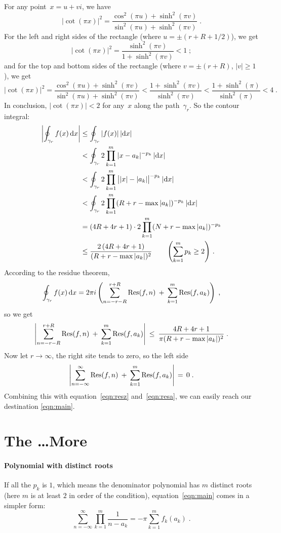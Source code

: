 \documentclass[10pt,a4paper]{article}
\begin{document}
	For any point~$x=u+vi$, we have
	\[
	|\cot (\pi x)|^2=\frac{\cos^2(\pi u)+\sinh^2(\pi v)}{\sin^2(\pi u)+\sinh^2(\pi v)}\; .
	\]
	For the left and right sides of the rectangle (where $u=\pm (r+R+1/2)$), we get
	\[
	|\cot (\pi x)|^2=\frac{\sinh^2(\pi v)}{1+\sinh^2(\pi v)}<1\; ;
	\]
	and for the top and bottom sides of the rectangle (where $v=\pm(r+R)$, $|v|\geq1$), we get
	\[
	|\cot (\pi x)|^2=\frac{\cos^2(\pi u)+\sinh^2(\pi v)}{\sin^2(\pi u)+\sinh^2(\pi v)}<\frac{1+\sinh^2(\pi v)}{\sinh^2(\pi v)}<\frac{1+\sinh^2(\pi)}{\sinh^2(\pi)}<4 \; .
	\]
	In conclusion, $|\cot (\pi x)|<2$ for any~$x$ along the path~$\gamma_r$. So the contour integral:
	\begin{align*}
	\left| \oint_{\gamma_r}f(x)\,\mathrm{d} x\right|&\leq  \oint_{\gamma_r}|f(x)|\,|\mathrm{d} x|  \\
	&<  \oint_{\gamma_r}2\prod_{k=1}^{m}|x-a_k | ^{-p_k}\,|\mathrm{d} x| \\
	&<  \oint_{\gamma_r}2\prod_{k=1}^{m}\big||x|-|a_k| \big| ^{-p_k}\,|\mathrm{d} x| \\
	&<  \oint_{\gamma_r}2\prod_{k=1}^{m}(R+r-\max|a_k| ) ^{-p_k}\,|\mathrm{d} x| \\
	&=  (4R+4r+1)\cdot 2\prod_{k=1}^{m}(N+r-\max|a_k| ) ^{-p_k} \\
	&\leq  \frac{2\,(4R+4r+1)}{(R+r-\max|a_k| )^2}\qquad \left( \sum^m_{k=1} p_k \geq 2\right) \, . 
	\end{align*}
	According to the residue theorem,
	\[
	\oint_{\gamma_r}f(x)\,\mathrm{d} x=2\pi i\left( \sum_{n=-r-R}^{r+R}\operatorname{Res}(f,n)\:+\:\sum_{k=1}^{m}\operatorname{Res}(f,a_k)\right) \; ,
	\]
	so we get
	\[
	\left| \sum_{n=-r-R}^{r+R}\operatorname{Res}(f,n)\:+\:\sum_{k=1}^{m}\operatorname{Res}(f,a_k)\right|  \:\leq\: \frac{4R+4r+1}{\pi (R+r-\max|a_k| )^2} \; .
	\]
	Now let $r \to \infty $, the right site tends to zero, so the left side
	\[
	\left| \sum_{n=-\infty}^{\infty}\operatorname{Res}(f,n)\:+\:\sum_{k=1}^{m}\operatorname{Res}(f,a_k)\right|\,=\,0\;.
	\]
	Combining this with equation~\eqref{eqn:resz} and~\eqref{eqn:resa}, we can easily reach our destination \eqref{eqn:main}.
	\section{The \ldots More}
	\paragraph{Polynomial with distinct roots\\}
	If all the $p_k$ is $1$, which means the denominator polynomial has $m$ distinct roots (here $m$ is at least $2$ in order of the condition), equation~\eqref{eqn:main} comes in a simpler form:
	\begin{equation}
	\sum_{n=-\infty}^{\infty}\prod_{k=1}^{m}\frac{1}{n-a_k}
	=-\pi\sum_{k=1}^{m}f_k(a_k )  \; .
	\label{eqn:droot}
	\end{equation}
\end{document}
